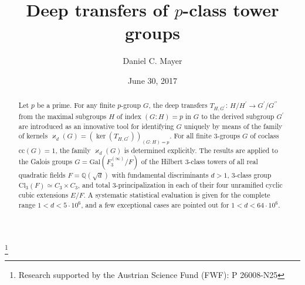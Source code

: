 \documentclass{amsart}
\theoremstyle{definition}
\numberwithin{equation}{section}
\begin{document}
\title{Deep transfers of \(p\)-class tower groups}

\author{Daniel C. Mayer}
\address{Naglergasse 53\\8010 Graz\\Austria}
\thanks{Research supported by the Austrian Science Fund (FWF): P 26008-N25}

\date{June 30, 2017}

\begin{abstract}
Let \(p\) be a prime.
For any finite \(p\)-group \(G\),
the deep transfers \(T_{H,G^\prime}:\,H/H^\prime\to G^\prime/G^{\prime\prime}\)
from the maximal subgroups \(H\) of index \((G:H)=p\) in \(G\) to the derived subgroup \(G^\prime\)
are introduced as an innovative tool for identifying \(G\) uniquely
by means of the family of kernels \(\varkappa_d(G)=(\ker(T_{H,G^\prime}))_{(G:H)=p}\).
For all finite \(3\)-groups \(G\) of coclass \(\mathrm{cc}(G)=1\),
the family \(\varkappa_d(G)\) is determined explicitly.
The results are applied to the Galois groups \(G=\mathrm{Gal}(F_3^{(\infty)}/F)\)
of the Hilbert \(3\)-class towers of all real quadratic fields \(F=\mathbb{Q}(\sqrt{d})\)
with fundamental discriminants \(d>1\), \(3\)-class group \(\mathrm{Cl}_3(F)\simeq C_3\times C_3\),
and total \(3\)-principalization in each of their four unramified cyclic cubic extensions \(E/F\).
A systematic statistical evaluation is given for the complete range \(1<d<5\cdot 10^6\),
and a few exceptional cases are pointed out for \(1<d<64\cdot 10^6\).
\end{abstract}

\maketitle


\end{document}
